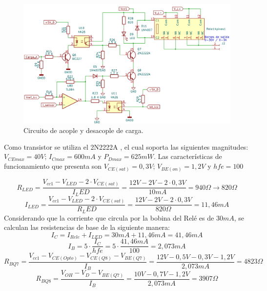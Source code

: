\begin{figure} [H]
	\centering
	\includegraphics[width=\textwidth]{./imagenes/Acople_carga.png}
	\caption{Circuito de acople y desacople de carga.}
	\label{F:Circuito_Acople_carga}
\end{figure} \par 

Como transistor se utiliza el 2N2222A \cite{2N2222}, el cual soporta las siguientes magnitudes: $V_{CEmax}=40V$; $I_{Cmax}=600 mA$ y $P_{Dmax}=625 mW$. Las características de funcionamiento que presenta son $V_{CE(sat)}=0,3V$; $V_{BE(on)}=1,2V$ y $hfe=100$

\begin{equation}
R_{LED}=\frac{V_{cc1}-V_{LED}-2\cdot V_{CE(sat)}}{I_LED}=\frac{12V-2V-2\cdot 0,3V}{10 mA}=940\Omega \to 820 \Omega
\end{equation}
\begin{equation}
I_{LED}=\frac{V_{cc1}-V_{LED}-2\cdot V_{CE(sat)}}{R_LED}=\frac{12V-2V-2\cdot 0,3V}{820 \Omega}=11,46 mA
\end{equation}
Considerando que la corriente que circula por la bobina del Relé es de $30 mA$, se calculan las resistencias de base de la siguiente manera:
\begin{equation}
I_C=I_{Rele}+I_{LED}=30mA+11,46 mA=41,46 mA
\end{equation}
\begin{equation}
I_B=5\cdot \frac{I_C}{hfe}=5\cdot \frac{41,46 mA}{100}=2,073 mA
\end{equation}
\begin{equation}
	R_{BQ7}=\frac{V_{cc1}-V_{CE(Opto)}-V_{CE(Q8)}-V_{BE(Q7)}}{I_B}=\frac{12V-0,5V-0,3V-1,2V}{2,073mA}=4823 \Omega
\end{equation}
\begin{equation}
	R_{BQ8}=\frac{V_{OH}-V_D-V_{BE(Q7)}}{I_B}=\frac{10V-0,7V-1,2V}{2,073 mA}=3907 \Omega
\end{equation}

